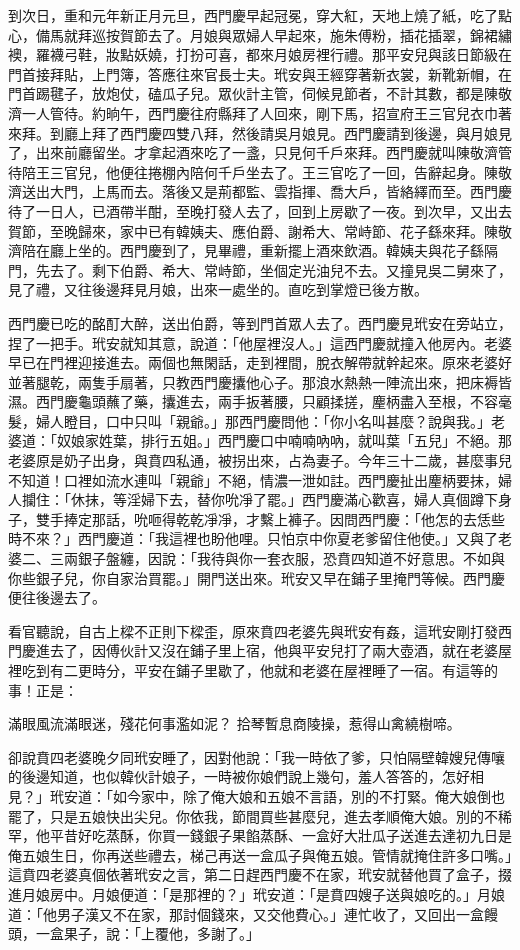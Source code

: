 到次日，重和元年新正月元旦，西門慶早起冠冕，穿大紅，天地上燒了紙，吃了點心，備馬就拜巡按賀節去了。月娘與眾婦人早起來，施朱傅粉，插花插翠，錦裙繡襖，羅襪弓鞋，妝點妖嬈，打扮可喜，都來月娘房裡行禮。那平安兒與該日節級在門首接拜貼，上門簿，答應往來官長士夫。玳安與王經穿著新衣裳，新靴新帽，在門首踢毽子，放炮仗，磕瓜子兒。眾伙計主管，伺候見節者，不計其數，都是陳敬濟一人管待。約晌午，西門慶往府縣拜了人回來，剛下馬，招宣府王三官兒衣巾著來拜。到廳上拜了西門慶四雙八拜，然後請吳月娘見。西門慶請到後邊，與月娘見了，出來前廳留坐。才拿起酒來吃了一盞，只見何千戶來拜。西門慶就叫陳敬濟管待陪王三官兒，他便往捲棚內陪何千戶坐去了。王三官吃了一回，告辭起身。陳敬濟送出大門，上馬而去。落後又是荊都監、雲指揮、喬大戶，皆絡繹而至。西門慶待了一日人，已酒帶半酣，至晚打發人去了，回到上房歇了一夜。到次早，又出去賀節，至晚歸來，家中已有韓姨夫、應伯爵、謝希大、常峙節、花子繇來拜。陳敬濟陪在廳上坐的。西門慶到了，見畢禮，重新擺上酒來飲酒。韓姨夫與花子繇隔門，先去了。剩下伯爵、希大、常峙節，坐個定光油兒不去。又撞見吳二舅來了，見了禮，又往後邊拜見月娘，出來一處坐的。直吃到掌燈已後方散。

西門慶已吃的酩酊大醉，送出伯爵，等到門首眾人去了。西門慶見玳安在旁站立，捏了一把手。玳安就知其意，說道：「他屋裡沒人。」這西門慶就撞入他房內。老婆早已在門裡迎接進去。兩個也無閑話，走到裡間，脫衣解帶就幹起來。原來老婆好並著腿乾，兩隻手扇著，只教西門慶攮他心子。那浪水熱熱一陣流出來，把床褥皆濕。西門慶龜頭蘸了藥，攮進去，兩手扳著腰，只顧揉搓，麈柄盡入至根，不容毫髮，婦人瞪目，口中只叫「親爺。」那西門慶問他：「你小名叫甚麼？說與我。」老婆道：「奴娘家姓葉，排行五姐。」西門慶口中喃喃吶吶，就叫葉「五兒」不絕。那老婆原是奶子出身，與賁四私通，被拐出來，占為妻子。今年三十二歲，甚麼事兒不知道！口裡如流水連叫「親爺」不絕，情濃一泄如註。西門慶扯出麈柄要抹，婦人攔住：「休抹，等淫婦下去，替你吮凈了罷。」西門慶滿心歡喜，婦人真個蹲下身子，雙手捧定那話，吮咂得乾乾凈凈，才繫上褲子。因問西門慶：「他怎的去恁些時不來？」西門慶道：「我這裡也盼他哩。只怕京中你夏老爹留住他使。」又與了老婆二、三兩銀子盤纏，因說：「我待與你一套衣服，恐賁四知道不好意思。不如與你些銀子兒，你自家治買罷。」開門送出來。玳安又早在鋪子里掩門等候。西門慶便往後邊去了。

看官聽說，自古上樑不正則下樑歪，原來賁四老婆先與玳安有姦，這玳安剛打發西門慶進去了，因傅伙計又沒在鋪子里上宿，他與平安兒打了兩大壺酒，就在老婆屋裡吃到有二更時分，平安在鋪子里歇了，他就和老婆在屋裡睡了一宿。有這等的事！正是：

滿眼風流滿眼迷，殘花何事濫如泥？
拾琴暫息商陵操，惹得山禽繞樹啼。

卻說賁四老婆晚夕同玳安睡了，因對他說：「我一時依了爹，只怕隔壁韓嫂兒傳嚷的後邊知道，也似韓伙計娘子，一時被你娘們說上幾句，羞人答答的，怎好相見？」玳安道：「如今家中，除了俺大娘和五娘不言語，別的不打緊。俺大娘倒也罷了，只是五娘快出尖兒。你依我，節間買些甚麼兒，進去孝順俺大娘。別的不稀罕，他平昔好吃蒸酥，你買一錢銀子果餡蒸酥、一盒好大壯瓜子送進去達初九日是俺五娘生日，你再送些禮去，梯己再送一盒瓜子與俺五娘。管情就掩住許多口嘴。」這賁四老婆真個依著玳安之言，第二日趕西門慶不在家，玳安就替他買了盒子，掇進月娘房中。月娘便道：「是那裡的？」玳安道：「是賁四嫂子送與娘吃的。」月娘道：「他男子漢又不在家，那討個錢來，又交他費心。」連忙收了，又回出一盒饅頭，一盒果子，說：「上覆他，多謝了。」

